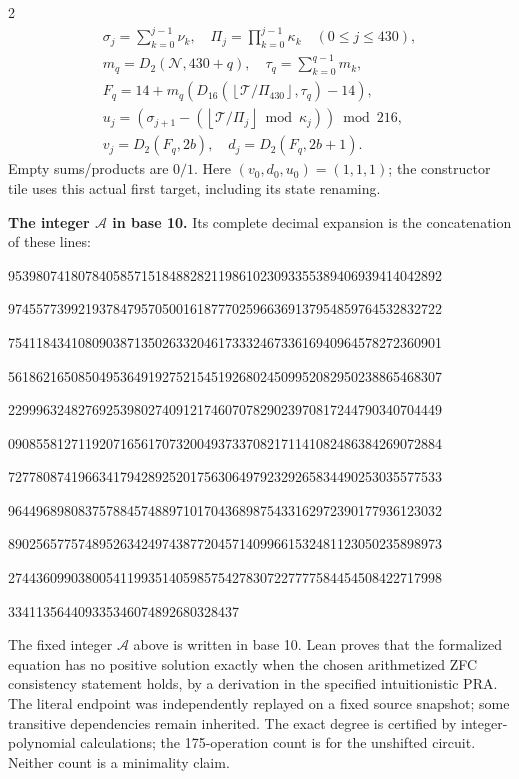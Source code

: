 \documentclass[10pt]{article}
\newcommand{\fl}[1]{\left\lfloor#1\right\rfloor}
\begin{document}
\begin{multicols}{2}
\[\begin{gathered}
\sigma_j=\sum_{k=0}^{j-1}\nu_k,\quad
\Pi_j=\prod_{k=0}^{j-1}\kappa_k\quad(0\le j\le430),\\
m_q=D_2(\mathcal N,430+q),\quad \tau_q=\sum_{k=0}^{q-1}m_k,\\
F_q=14+m_q(D_{16}(\fl{\mathcal T/\Pi_{430}},\tau_q)-14),\\
u_j=(\sigma_{j+1}-(\fl{\mathcal T/\Pi_j}\bmod\kappa_j))\bmod216,\\
v_j=D_2(F_q,2b),\quad d_j=D_2(F_q,2b+1).
\end{gathered}
\]
Empty sums/products are $0/1$. Here $(v_0,d_0,u_0)=(1,1,1)$; the constructor tile
uses this actual first target, including its state renaming.

\textbf{The integer $\mathcal A$ in base 10.}
Its complete decimal expansion is the concatenation of these lines:\par
\begingroup\fontsize{7.7}{8.2}\selectfont{}\par
95398074180784058571518488282119861023093355389406939414042892\par
97455773992193784795705001618777025966369137954859764532832722\par
75411843410809038713502633204617333246733616940964578272360901\par
56186216508504953649192752154519268024509952082950238865468307\par
22999632482769253980274091217460707829023970817244790340704449\par
09085581271192071656170732004937337082171141082486384269072884\par
72778087419663417942892520175630649792329265834490253035577533\par
96449689808375788457488971017043689875433162972390177936123032\par
89025657757489526342497438772045714099661532481123050235898973\par
27443609903800541199351405985754278307227777584454508422717998\par
334113564409335346074892680328437\par
\endgroup
\normalfont\fontsize{7.7}{8.2}\selectfont
The fixed integer $\mathcal A$ above is written in base 10. Lean proves that the formalized equation has no positive solution exactly
when the chosen arithmetized ZFC consistency statement holds, by a derivation
in the specified intuitionistic PRA. The literal endpoint was independently
replayed on a fixed source snapshot; some transitive dependencies remain
inherited. The exact degree is certified by integer-polynomial calculations;
the 175-operation count is for the unshifted circuit. Neither count is a
minimality claim.
\end{multicols}
\end{document}
